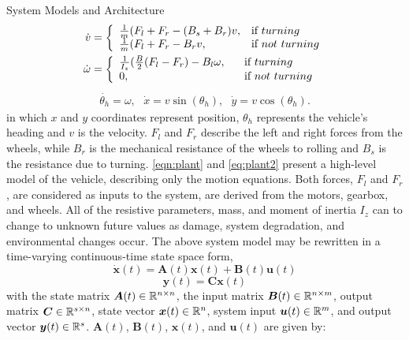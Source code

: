 \begin{section}{System Models and Architecture}
	\begin{equation}
    \begin{split}
    \label{eqn:plant}
    \dot{v}&=\left\{
    \begin{array}{ll}
    \frac{1}{m}(F_l+F_r-(B_s+B_r)v, & \hbox{if } turning\\
    \frac{1}{m}(F_l+F_r-B_rv, & \hbox{if } not~turning
    \end{array}
    \right.\\
    \dot{\omega}&=\left\{
    \begin{array}{ll}
    \frac{1}{I_z}(\frac{B}{2}(F_l-F_r)-B_l\omega, \text{      } & \text{     if } turning\\
    0, \text{      } & \text{     if } not~turning
    \end{array}
    \right.\\
    \end{split}
    \end{equation}
    \begin{align}
    \label{eq:plant2}
     \dot{\theta_h}=\omega,\text{ } \dot{x}=v\sin(\theta_h),\text{ } \dot{y}=v\cos(\theta_h).
	\end{align}
in which $x$ and $y$ coordinates represent position, $\theta_h$ represents the vehicle's heading
 and $v$ is the velocity. $F_l$ and $F_r$ describe the left and right forces from the wheels, while $B_r$ is the mechanical resistance of the wheels to rolling and $B_s$ is the resistance due to turning.
\eqref{eqn:plant} and \eqref{eq:plant2} present a high-level model of the vehicle, describing only the motion equations. Both forces, $F_l$ and $F_r$, are considered as inputs to the system, are derived from the motors, gearbox, and wheels. All of the resistive parameters, mass, and moment of inertia $I_z$ can to change to unknown future values as damage, system degradation, and environmental changes occur. The above system model may be rewritten in a time-varying continuous-time state space form,
    \begin{equation}
	\dot{\bm{x}}(t) = \bm{A}(t)\bm{x}(t) + \bm{B}(t)\bm{u}(t)
	\end{equation}
    \begin{equation}
	\bm{y}(t) = \bm{C}\bm{x}(t)
	\end{equation}
with the state matrix $\bm{A}(t) \in \mathbb{R}^{n\times n}$, the input matrix $\bm{B}(t) \in \mathbb{R}^{n\times m}$, output matrix $\bm{C} \in \mathbb{R}^{s\times n}$, state vector $\bm{x}(t) \in \mathbb{R}^{n}$, system input $\bm{u}(t) \in \mathbb{R}^{m}$, and output vector $\bm{y}(t) \in \mathbb{R}^{s}$. $\bm{A}(t)$, $\bm{B}(t)$, $\bm{x}(t)$, and $\bm{u}(t)$ are given by: 


\end{section}
